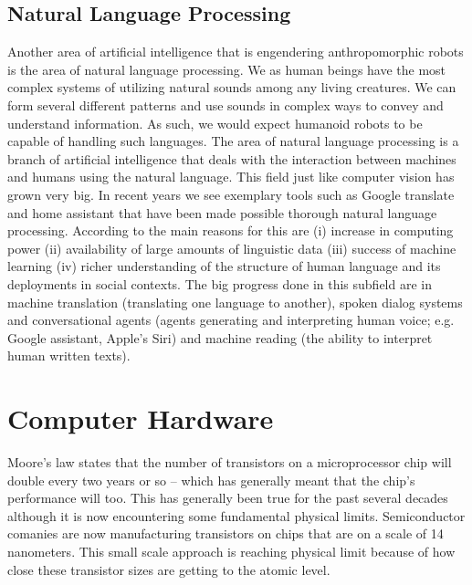 \documentclass[conference]{IEEEtran}
\begin{document}
\subsection{Natural Language Processing}
Another area of artificial intelligence that is engendering anthropomorphic robots is the area of natural language processing. We as human beings have the most complex systems of utilizing natural sounds among any living creatures. We can form several different patterns and use sounds in complex ways to convey and understand information. As such, we would expect humanoid robots to be capable of handling such languages. The area of natural language processing is a branch of artificial intelligence that deals with the interaction between machines and humans using the natural language. This field just like computer vision has grown very big. In recent years we see exemplary tools such as Google translate and home assistant that have been made possible thorough natural language processing. According to \textcite{hirschberg2015advances} the main reasons for this are (i) increase in computing power (ii) availability of large amounts of linguistic data (iii) success of machine learning (iv) richer understanding of the structure of human language and its deployments in social contexts. The big progress done in this subfield are in machine translation (translating one language to another), spoken dialog systems and conversational agents (agents generating and interpreting human voice; e.g. Google assistant, Apple's Siri) and machine reading (the ability to interpret human written texts)\autocite{hirschberg2015advances}.

\section{Computer Hardware}
Moore’s law states that the number of transistors on a microprocessor chip will double every two years or so -- which has generally meant that the chip's performance will too\autocite{waldrop2016chips}. This has generally been true for the past several decades although  it is now encountering some fundamental physical limits. Semiconductor comanies are now manufacturing transistors on chips that are on a scale of 14 nanometers\autocite{pratt2015cambrian}. This small scale approach is reaching physical limit because of how close these transistor sizes are getting to the atomic level\autocite{waldrop2016chips}.
\end{document}

